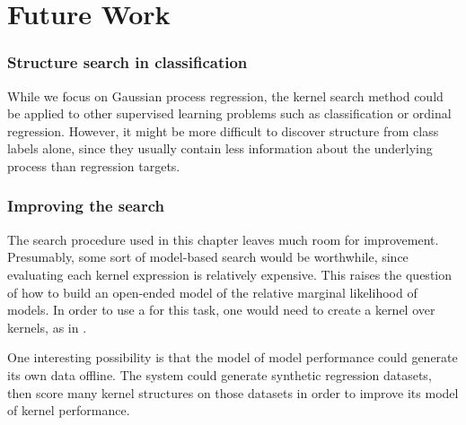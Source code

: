 \iffalse
\section{Future Work}

\subsubsection{Structure search in classification}
While we focus on Gaussian process regression, the kernel search method could be applied to other supervised learning problems such as classification or ordinal regression.
However, it might be more difficult to discover structure from class labels alone, since they usually contain less information about the underlying process than regression targets.

\subsubsection{Improving the search}
The search procedure used in this chapter leaves much room for improvement.
Presumably, some sort of model-based search would be worthwhile, since evaluating each kernel expression is relatively expensive.
This raises the question of how to build an open-ended model of the relative marginal likelihood of \gp{} models.
In order to use a \gp{} for this task, one would need to create a kernel over kernels, as in \citet{ong2002hyperkernels}.

One interesting possibility is that the model of model performance could generate its own data offline.
The system could generate synthetic regression datasets, then score many kernel structures on those datasets in order to improve its model of kernel performance.



